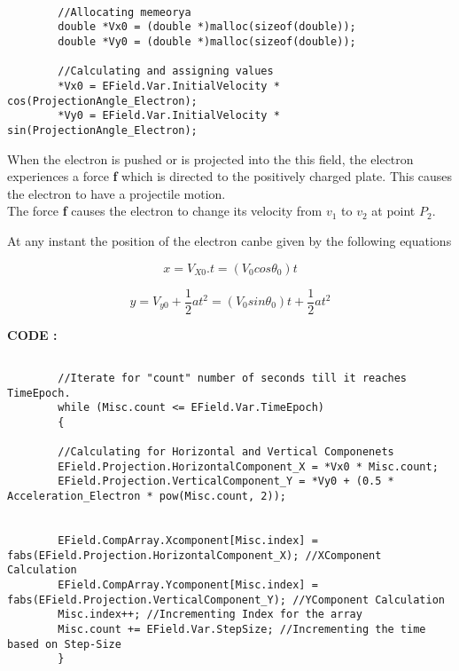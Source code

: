 \documentclass[a4paper,20pt,twoside]{report}
\begin{document}
	\begin{lstlisting}
		
		//Allocating memeorya
		double *Vx0 = (double *)malloc(sizeof(double));
		double *Vy0 = (double *)malloc(sizeof(double));
		
		//Calculating and assigning values
		*Vx0 = EField.Var.InitialVelocity * cos(ProjectionAngle_Electron);
		*Vy0 = EField.Var.InitialVelocity * sin(ProjectionAngle_Electron);
	\end{lstlisting}
	
	\vspace{10mm}
	
	When the electron is pushed or is projected into the this field, the electron experiences 
	a force \textbf{f} which is directed to the positively charged plate. This causes the electron
	to have a projectile motion.\\
	
	The force \textbf{f} causes the electron to change its velocity from $v_1$ to $v_2$ at point $P_2$.
	
	At any instant the position of the electron canbe given by the following equations 
	
	\begin{equation}
	x = V_{X0} . t = \left(V_0cos\theta_0\right)t
	\end{equation}
	
	\begin{equation}
	y  =  V_{y0}  + \frac{1}{2}at^2 = (V_0 sin\theta_0)t + \frac{1}{2}at^2
	\end{equation}
	
	\textbf{CODE :}
	\begin{lstlisting}
	
		//Iterate for "count" number of seconds till it reaches TimeEpoch.
		while (Misc.count <= EField.Var.TimeEpoch)
		{
		
		//Calculating for Horizontal and Vertical Componenets
		EField.Projection.HorizontalComponent_X = *Vx0 * Misc.count;
		EField.Projection.VerticalComponent_Y = *Vy0 + (0.5 * Acceleration_Electron * pow(Misc.count, 2));
		
		
		EField.CompArray.Xcomponent[Misc.index] = fabs(EField.Projection.HorizontalComponent_X); //XComponent Calculation
		EField.CompArray.Ycomponent[Misc.index] = fabs(EField.Projection.VerticalComponent_Y); //YComponent Calculation
		Misc.index++; //Incrementing Index for the array
		Misc.count += EField.Var.StepSize; //Incrementing the time based on Step-Size
		}
	\end{lstlisting}
	
\end{document}
